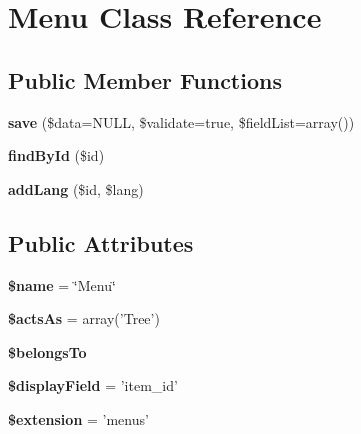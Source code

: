 \hypertarget{class_menu}{
\section{\-Menu \-Class \-Reference}
\label{class_menu}
}
\subsection*{\-Public \-Member \-Functions}
\begin{DoxyCompactItemize}
\item 
\hypertarget{class_menu_ac058b2b7066ad6a7f256ee575dc00eb4}{
{\bfseries save} (\$data=\-N\-U\-L\-L, \$validate=true, \$field\-List=array())}
\label{class_menu_ac058b2b7066ad6a7f256ee575dc00eb4}

\item 
\hypertarget{class_menu_a2b13b064788d5990ac47ba5deb697b33}{
{\bfseries find\-By\-Id} (\$id)}
\label{class_menu_a2b13b064788d5990ac47ba5deb697b33}

\item 
\hypertarget{class_menu_a9e30482b81585f1402a6618d1e6b105f}{
{\bfseries add\-Lang} (\$id, \$lang)}
\label{class_menu_a9e30482b81585f1402a6618d1e6b105f}

\end{DoxyCompactItemize}
\subsection*{\-Public \-Attributes}
\begin{DoxyCompactItemize}
\item 
\hypertarget{class_menu_a65507f7a0c90f5112ea866f1f85b14df}{
{\bfseries \$name} = \char`\"{}\-Menu\char`\"{}}
\label{class_menu_a65507f7a0c90f5112ea866f1f85b14df}

\item 
\hypertarget{class_menu_aac96d83d4d2682fc63dce7d4f936e4ba}{
{\bfseries \$acts\-As} = array('\-Tree')}
\label{class_menu_aac96d83d4d2682fc63dce7d4f936e4ba}

\item 
{\bfseries \$belongs\-To}
\item 
\hypertarget{class_menu_a1ba3c415288c092d95d073c740ce6a78}{
{\bfseries \$display\-Field} = 'item\-\_\-id'}
\label{class_menu_a1ba3c415288c092d95d073c740ce6a78}

\item 
\hypertarget{class_menu_a8d458ff3f501e0d2157a1cc42824cb8d}{
{\bfseries \$extension} = 'menus'}
\label{class_menu_a8d458ff3f501e0d2157a1cc42824cb8d}

\end{DoxyCompactItemize}


